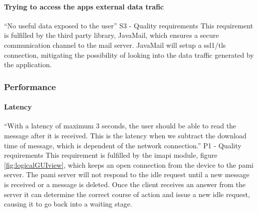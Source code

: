 \paragraph{Trying to access the apps external data trafic}\hfill
\newline
“No useful data exposed to the user” S3 - Quality requirements
\newline
\newline
This requirement is fulfilled by the third party library, JavaMail, which ensures a secure communication channel to the mail server. JavaMail  will setup a \gls{ssl1}/\gls{tls} connection, mitigating the possibility of looking into the data traffic generated by the application.

\subsubsection{Performance}

\paragraph{Latency}\hfill
\newline
“With a latency of maximum 3 seconds, the user should be able to read the message after it is received. This is the latency when we subtract the download time of message, which is dependent of the network connection.” P1 - Quality requirements
\newline
\newline
This requirement is fulfilled by the \gls{imapi} module, figure \ref{fig:logicalGUIview}, which keeps an open connection from the device to the \gls{pami} server. The \gls{pami} server will not respond to the \gls{idle} request until a new message is received or a message is deleted. Once the client receives an answer from the server it can determine the correct course of action and issue a new \gls{idle} request, causing it to go back into a waiting stage\cite{bib:imapi}. 